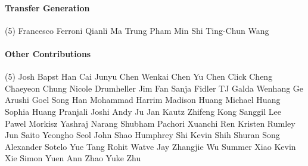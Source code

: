 \vspace{-0.32\baselineskip}\paragraph{\footnotesize Transfer Generation} \mbox{}
\vspace{-0.32\baselineskip}
\begingroup
\footnotesize
\begin{tasks}[label=\relax, label-width=0pt, item-indent=4pt](5)
\task Francesco Ferroni
\task Qianli Ma
\task Trung Pham
\task Min Shi
\task Ting-Chun Wang
\end{tasks}
\endgroup

\paragraph{Other Contributions} \mbox{}
\vspace{-0.32\baselineskip}
\begingroup
\footnotesize
\begin{tasks}[label=\relax, label-width=0pt, item-indent=4pt](5)
\task Josh Bapst 
\task Han Cai 
\task Junyu Chen 
\task Wenkai Chen
\task Yu Chen
\task Click Cheng 
\task Chaeyeon Chung 
\task Nicole Drumheller 
\task Jim Fan 
\task Sanja Fidler 
\task TJ Galda 
\task Wenhang Ge 
\task Arushi Goel 
\task Song Han 
\task Mohammad Harrim 
\task Madison Huang 
\task Michael Huang 
\task Sophia Huang 
\task Pranjali Joshi 
\task Andy Ju 
\task Jan Kautz 
\task Zhifeng Kong 
\task Sanggil Lee 
\task Pawel Morkisz 
\task Yashraj Narang 
\task Shubham Pachori 
\task Xuanchi Ren 
\task Kristen Rumley 
\task Jun Saito 
\task Yeongho Seol 
\task John Shao
\task Humphrey Shi 
\task Kevin Shih 
\task Shuran Song 
\task Alexander Sotelo 
\task Yue Tang 
\task Rohit Watve 
\task Jay Zhangjie Wu 
\task Summer Xiao
\task Kevin Xie 
\task Simon Yuen 
\task Ann Zhao
\task Yuke Zhu 
\end{tasks}
\endgroup

